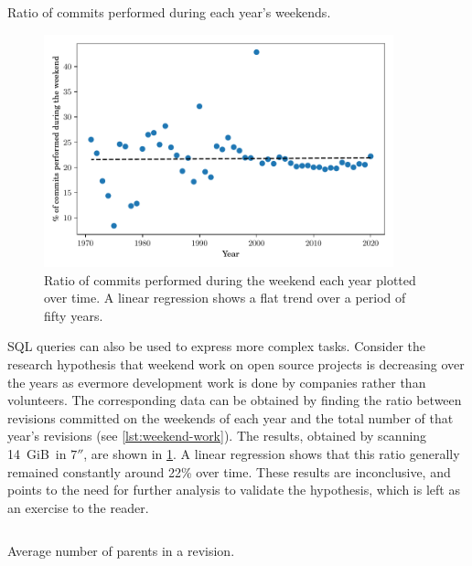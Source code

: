 \begin{listing}
    \inputminted[firstline=3]{sql}{codesamples/graph-dataset/weekend-work.sql}
    \caption{Ratio of commits performed during each year's weekends.}%
    \label{lst:weekend-work}
\end{listing}

\begin{figure}
    \centering
    \includegraphics[width=0.9\textwidth]{img/graph-dataset/weekend-work}
    \caption{Ratio of commits performed during the weekend each year plotted
    over time. A linear regression shows a flat trend over a period of fifty
    years.}%
    \label{fig:weekend-work}
\end{figure}


SQL queries can also be used to express more complex tasks.  Consider the
research hypothesis that weekend work on open source projects is decreasing
over the years as evermore development work is done by companies rather than
volunteers.  The corresponding data can be obtained by finding the ratio
between revisions committed on the weekends of each year and the total number
of that year's revisions (see \cref{lst:weekend-work}).
The results, obtained by scanning 14~GiB\ in $7''$, are shown in
\cref{fig:weekend-work}. A linear regression shows that this ratio generally
remained constantly around 22\% over time. These results are inconclusive, and
points to the need for further analysis to validate the hypothesis, which is
left as an exercise to the reader.

\begin{listing}
    \inputminted[firstline=4]{sql}{codesamples/graph-dataset/fork-size.sql}
    \caption{Average number of parents in a revision.}%
    \label{lst:fork-size}
\end{listing}

